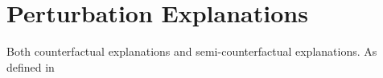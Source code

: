 \section{Perturbation Explanations}

Both counterfactual explanations and semi-counterfactual explanations.
As defined in \cite{}